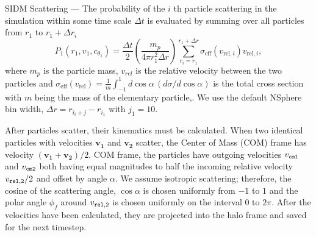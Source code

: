 \documentclass[%
 reprint,
 amsmath,
 amssymb,
 aps,
]{revtex4-2}
\begin{document}
SIDM Scattering --- 
The probability of the $i$ th particle scattering in the simulation within some time scale $\Delta t$ is evaluated by summing over all particles from $r_1$ to $r_1 + \Delta r_i$
\begin{equation}\label{eq-scatter-probability}
    P_1(r_1, v_1, c_{\theta_1}) = \frac{\Delta t}{2} \left(\frac{m_p}{4\pi r_1^2 \Delta r}\right) \sum_{r_i=r_1}^{r_1+\Delta r} \sigma_{\text{eff}}(v_{\text{rel},i}) v_{\text{rel},i},
\end{equation}
where $m_p$ is the particle mass, $v_{rel}$ is the relative velocity between the two particles and $\sigma_{\text{eff}}(v_{\text{rel}}) = \frac{1}{m}\int_{-1}^{1} d\cos\alpha \, (d\sigma/d\cos\alpha)$ is the total cross section with $m$ being the mass of the elementary particle,.  
We use the default NSphere bin width, $\Delta r = r_{i_i + j} - r_{i_1}$ with $j_{1} = 10$.

After particles scatter, their kinematics must be calculated. When two identical particles with velocities $\mathbf{v_1}$ and $\mathbf{v_2}$ scatter,  the Center of Mass (COM) frame has velocity $\left ( \mathbf{v_1} + \mathbf{v_2} \right ) / 2$. COM frame, the particles have outgoing velocities $v_{\tt cm 1}$ and $v_{\tt cm 2}$ both having equal magnitudes to half the incoming relative velocity $v_{\tt rel, 2} / 2$ and offset by angle $\alpha$. We assume isotropic scattering; therefore, the cosine of the scattering angle, $\cos \alpha$ is chosen uniformly from $-1$ to $1$ and the polar angle $\phi_f$ around $v_{\tt rel, 2}$ is chosen uniformly on the interval $0$ to $2 \pi$. After the velocities have been calculated, they are projected into the halo frame and saved for the next timestep.
\end{document}
